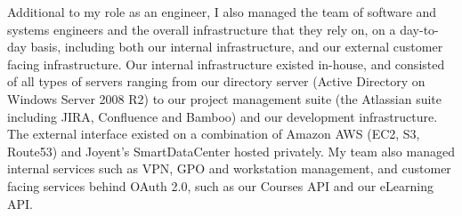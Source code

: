 \documentclass[margin,line]{resume}
\begin{document}
\begin{resume}
		Additional to my role as an engineer, I also managed the team of software and systems engineers and the overall infrastructure that they rely on, on a day-to-day basis, including both our internal infrastructure, and our external customer facing infrastructure. Our internal infrastructure existed in-house, and consisted of all types of servers ranging from our directory server (Active Directory on Windows Server 2008 R2) to our project management suite (the Atlassian suite including JIRA, Confluence and Bamboo) and our development infrastructure. The external interface existed on a combination of Amazon AWS (EC2, S3, Route53) and Joyent's SmartDataCenter hosted privately. My team also managed internal services such as VPN, GPO and workstation management, and customer facing services behind OAuth 2.0, such as our Courses API and our eLearning API.




\end{resume}
\end{document}
